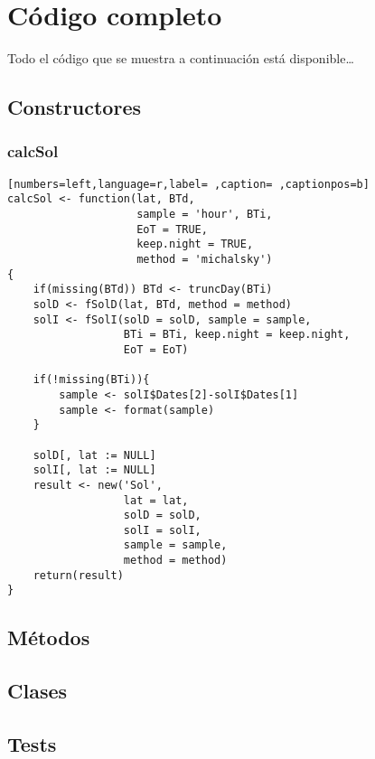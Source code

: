 \chapter{Código completo}

Todo el código que se muestra a continuación está disponible\ldots{}

\section{Constructores}
\label{sec:org2a829d2}
\subsection{calcSol}
\label{sec:orgd273e22}
\begin{lstlisting}[numbers=left,language=r,label= ,caption= ,captionpos=b]
calcSol <- function(lat, BTd,
                    sample = 'hour', BTi,
                    EoT = TRUE,
                    keep.night = TRUE,
                    method = 'michalsky')
{
    if(missing(BTd)) BTd <- truncDay(BTi)
    solD <- fSolD(lat, BTd, method = method)
    solI <- fSolI(solD = solD, sample = sample,
                  BTi = BTi, keep.night = keep.night,
                  EoT = EoT)

    if(!missing(BTi)){
        sample <- solI$Dates[2]-solI$Dates[1]
        sample <- format(sample)
    }

    solD[, lat := NULL]
    solI[, lat := NULL]
    result <- new('Sol',
                  lat = lat,
                  solD = solD,
                  solI = solI,
                  sample = sample,
                  method = method)
    return(result)
}
\end{lstlisting}
\section{Métodos}
\label{sec:orge4f60c5}
\section{Clases}
\label{sec:org1a30498}
\section{Tests}
\label{sec:orgec7b817}
